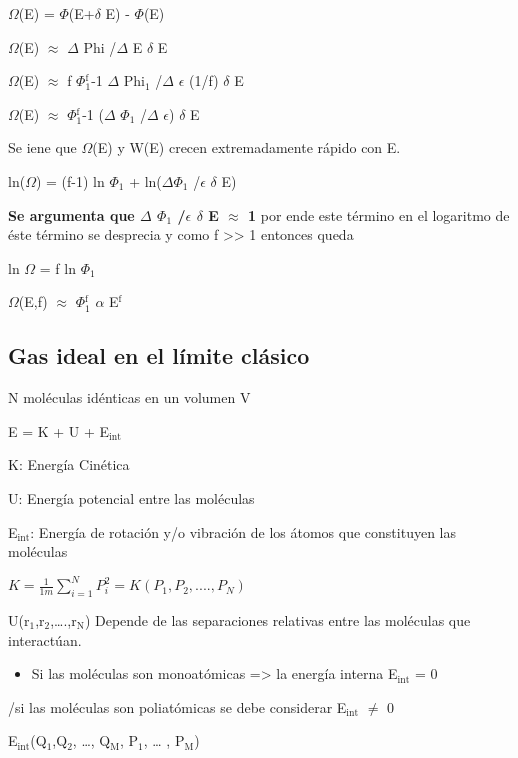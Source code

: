 \documentclass[11pt]{article}
\begin{document}
$\Omega$(E) = $\Phi$(E+$\delta$ E) - $\Phi$(E)

$\Omega$(E) $\approx$ $\Delta$ Phi /$\Delta$ E $\delta$ E

$\Omega$(E) $\approx$ f $\Phi$$_{\text{1}}^{\text{f}}$-1 $\Delta$ Phi$_{\text{1}}$ /$\Delta$ $\epsilon$ (1/f) $\delta$ E

$\Omega$(E) $\approx$ $\Phi$$_{\text{1}}^{\text{f}}$-1 ($\Delta$ $\Phi$$_{\text{1}}$ /$\Delta$ $\epsilon$) $\delta$ E

Se iene que $\Omega$(E) y W(E) crecen extremadamente rápido con E.

ln($\Omega$) = (f-1) ln $\Phi$$_{\text{1}}$ + ln($\Delta$$\Phi$$_{\text{1}}$ /$\epsilon$   $\delta$ E)

\textbf{Se argumenta que $\Delta$ $\Phi$$_{\text{1}}$ /$\epsilon$ $\delta$ E $\approx$ 1} por ende
 este término en el logaritmo de éste término se desprecia y como f >> 1 entonces queda

ln $\Omega$ = f ln $\Phi$$_{\text{1}}$

$\Omega$(E,f) $\approx$ $\Phi$$_{\text{1}}^{\text{f}}$ $\alpha$ E$^{\text{f}}$

\subsection{Gas ideal en el límite clásico}
\label{sec-1-6}

N moléculas idénticas en un volumen V

E = K + U + E$_{\text{int}}$

K: Energía Cinética

U: Energía potencial entre las moléculas

E$_{\text{int}}$: Energía de rotación y/o vibración de los átomos que constituyen las moléculas

$K = \frac{1}{1m} \sum\limits_{i=1}^N P_i^2 = K(P_1,P_2,....,P_N)$


U(r$_{\text{1}}$,r$_{\text{2}}$,\ldots{}.,r$_{\text{N}}$) Depende de las separaciones relativas entre las
moléculas que interactúan.

\begin{itemize}
\item Si las moléculas son monoatómicas => la energía interna E$_{\text{int}}$ = 0
\end{itemize}
/si las moléculas son poliatómicas se debe considerar E$_{\text{int}}$ $\neq$ 0

E$_{\text{int}}$(Q$_{\text{1}}$,Q$_{\text{2}}$, \ldots{}, Q$_{\text{M}}$, P$_{\text{1}}$, \ldots{} , P$_{\text{M}}$)
\end{document}
